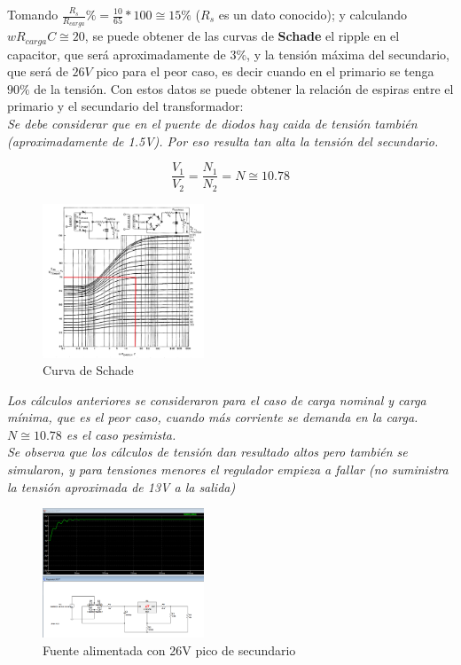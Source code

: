 \documentclass[letterpaper, 10 pt, conference]{ieeeconf}  %
\begin{document}
Tomando $\frac{R_s}{R_{carga}}\% = \frac{10}{65}*100 \cong 15\%$ ($R_s$ es un dato conocido); y calculando $wR_{carga}C \cong 20$, se puede obtener de las curvas de \textbf{Schade} el ripple en el capacitor, que será aproximadamente de $3\%$, y la tensión máxima del secundario, que será de $26V$ pico para el peor caso, es decir cuando en el primario se tenga $90\%$ de la tensión. Con estos datos se puede obtener la relación de espiras entre el primario y el secundario del transformador: \\
\textit{Se debe considerar que en el puente de diodos hay caida de tensión también (aproximadamente de 1.5V). Por eso resulta tan alta la tensión del secundario.}

\begin{equation}
  \frac{V_1}{V_2} = \frac{N_1}{N_2} = N \cong 10.78
\end{equation}

\begin{figure}[H]
  \centering
  \includegraphics[width=0.43\textwidth]{./imagenes/schade_edc_et.png}
  \caption{Curva de Schade}
  \label{fig:schade_edc_sobre_etmax}
\end{figure}

\textit{Los cálculos anteriores se consideraron para el caso de carga nominal y carga mínima, que es el peor caso, cuando más corriente se demanda en la carga. $N \cong 10.78$ es el caso pesimista.} \\

\textit{Se observa que los cálculos de tensión dan resultado altos pero también se simularon, y para tensiones menores el regulador empieza a fallar (no suministra la tensión aproximada de 13V a la salida)}

\begin{figure}[H]
  \centering
  \includegraphics[width=0.43\textwidth]{./imagenes/sim_fuente_bien.png}
  \caption{Fuente alimentada con 26V pico de secundario}
\end{figure}
\end{document}
